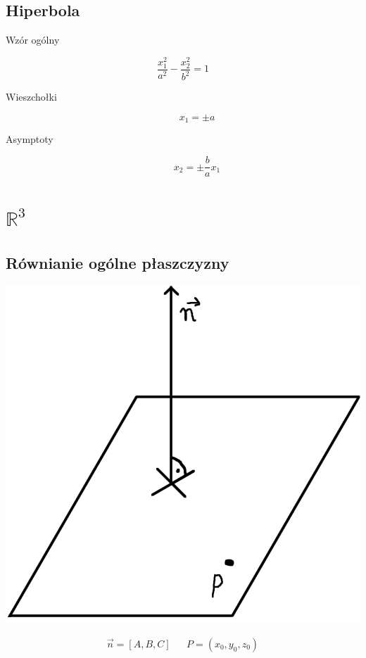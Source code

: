 \documentclass[11pt]{article}
\begin{document}
\subsection{Hiperbola}
\label{sec:org5a02068}
\begin{description}
\item[{Wzór ogólny}] 
\end{description}
$$\frac{x_1^2}{a^2}-\frac{x_2^2}{b^2}=1$$
\begin{description}
\item[{Wieszchołki}] $$x_1 = \pm a$$
\item[{Asymptoty}] $$x_2 = \pm \frac{b}{a}x_1$$
\end{description}

\section{\(\mathbb{R}^3\)}
\label{sec:org660e62d}
\subsection{Równianie ogólne płaszczyzny}
\label{sec:orge3e2e57}

\begin{center}
\includegraphics[width=.9\linewidth]{figures/plaszczyzna.png}
\end{center}

\begin{latex}
\begin{align*}
\vec{n}=[A,B,C] && P=(x_{0}, y_{0}, z_{0})
\end{align*}
\end{latex}
\end{document}
